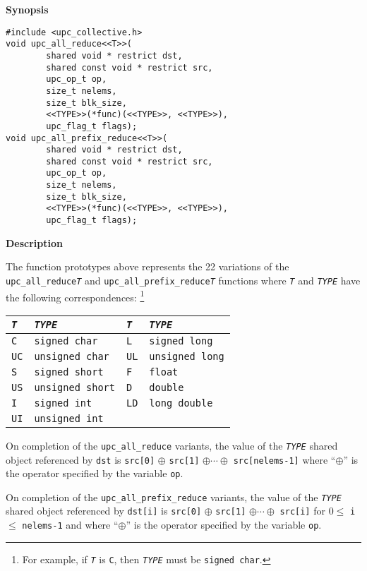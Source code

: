 {\bf Synopsis} 

\npf 
\begin{verbatim}
#include <upc_collective.h>
void upc_all_reduce<<T>>(
        shared void * restrict dst,
        shared const void * restrict src,
        upc_op_t op,
        size_t nelems,
        size_t blk_size,
        <<TYPE>>(*func)(<<TYPE>>, <<TYPE>>),
        upc_flag_t flags);
void upc_all_prefix_reduce<<T>>(
        shared void * restrict dst,
        shared const void * restrict src,
        upc_op_t op,
        size_t nelems,
        size_t blk_size,
        <<TYPE>>(*func)(<<TYPE>>, <<TYPE>>),
        upc_flag_t flags);
\end{verbatim}

{\bf Description} 

\np The function prototypes above represents the 22 variations of the
  {\tt upc\_all\_reduce{\em T}} and {\tt upc\_all\_prefix\_reduce{\em T}} 
  functions where {\tt{\em T}} and {\tt{\em TYPE}} have the following 
correspondences: \footnote{For example, if {\tt{\em T}} is {\tt C}, then 
{\tt{\em TYPE}} must be {\tt signed char}.}
\begin{center}
\begin{tabular}{ll|ll}
{\tt{\em T}} & {\tt{\em TYPE}} \hspace*{1.5in} &
{\tt{\em T}} & {\tt{\em TYPE}} \\ \hline
{\tt C} & {\tt signed char} &
{\tt L} & {\tt signed long} \\
{\tt UC} & {\tt unsigned char} &
{\tt UL} & {\tt unsigned long} \\
{\tt S} & {\tt signed short} &
{\tt F} & {\tt float} \\
{\tt US} & {\tt unsigned short} &
{\tt D} & {\tt double} \\
{\tt I} & {\tt signed int} &
{\tt LD} & {\tt long double} \\
{\tt UI} & {\tt unsigned int} &
\end{tabular}
\end{center}

\np On completion of the {\tt upc\_all\_reduce} variants, 
the value of the {\tt{\em TYPE}} shared object
referenced by {\tt dst} is
{\tt src[0]} $\oplus$ {\tt src[1]} $\oplus \cdots \oplus$
{\tt src[nelems-1]}
where ``$\oplus$'' is the operator specified by the variable {\tt op}.

\np On completion of the {\tt upc\_all\_prefix\_reduce} variants, 
the value of the {\tt{\em TYPE}} shared object
referenced by {\tt dst[i]} is
{\tt src[0]} $\oplus$ {\tt src[1]}
$\oplus \cdots \oplus$ {\tt src[i]}
for $0 \leq$ {\tt i} $\leq$ {\tt nelems-1} and
where ``$\oplus$'' is the operator specified by the variable {\tt op}.

